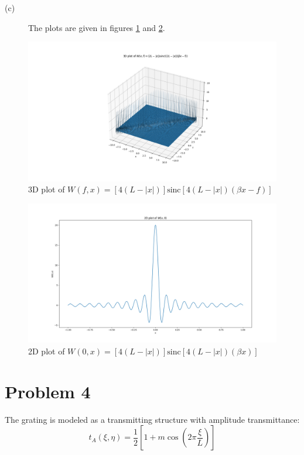 \documentclass[a4paper,11pt]{article}
\begin{document}
\begin{description}
\item[{(c)}] The plots are given in figures \ref{fig:orga2461dc} and \ref{fig:orgf3c3f84}.
\end{description}

\begin{figure}[!htb]
\centering
\includegraphics[width=17cm]{3D_plot.png}
\caption{\label{fig:orga2461dc}3D plot of \(W(f,x)= [4(L-|x|)]\text{sinc}[4(L-|x|)(\beta x-f)]\)}
\end{figure}

\begin{figure}[!htb]
\centering
\includegraphics[width=17cm]{2D_plot.png}
\caption{\label{fig:orgf3c3f84}2D plot of \(W(0,x)= [4(L-|x|)]\text{sinc}[4(L-|x|)(\beta x)]\)}
\end{figure}
\newpage
\section*{Problem 4}
\label{sec:orgf03d483}
The grating is modeled as a transmitting structure with amplitude transmittance:
$$t_{A}(\xi,\eta) = \frac{1}{2}\left[1+m\cos\left(2\pi\frac{\xi}{L}\right)\right]$$
\end{document}
